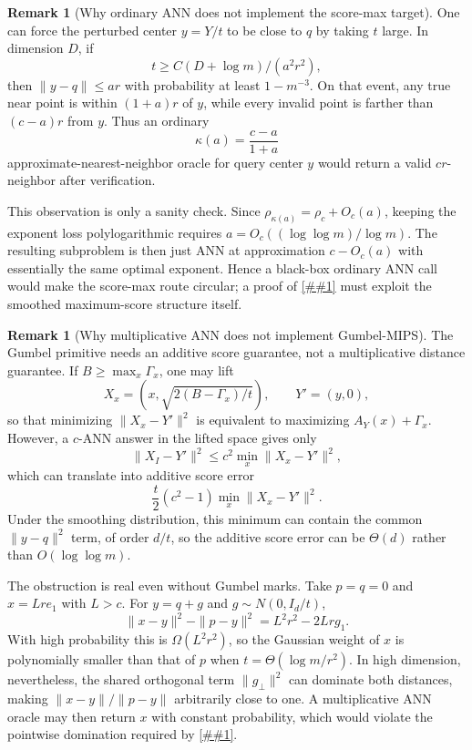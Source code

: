 \documentclass[10pt]{article}
\newcommand{\cref}[1]{\ref{##1}}
\theoremstyle{definition}
\newtheorem{remark}[theorem]{Remark}
\begin{document}
\begin{remark}[Why ordinary ANN does not implement the score-max target]\label{rem:score-max-ordinary-ann}
   One can force the perturbed center $y=Y/t$ to be close to $q$ by taking
   $t$ large. In dimension $D$, if
   \[
      t\ge C(D+\log m)/(a^2r^2),
   \]
   then $\|y-q\|\le ar$ with probability at least $1-m^{-3}$. On that event,
   any true near point is within $(1+a)r$ of $y$, while every invalid point is
   farther than $(c-a)r$ from $y$. Thus an ordinary
   \[
      \kappa(a)=\frac{c-a}{1+a}
   \]
   approximate-nearest-neighbor oracle for query center $y$ would return a
   valid $cr$-neighbor after verification.

   This observation is only a sanity check. Since
   $\rho_{\kappa(a)}=\rho_c+O_c(a)$, keeping the exponent loss polylogarithmic
   requires $a=O_c((\log\log m)/\log m)$. The resulting subproblem is then just
   ANN at approximation $c-O_c(a)$ with essentially the same optimal exponent.
   Hence a black-box ordinary ANN call would make the score-max route circular;
   a proof of \cref{asm:smoothed-score-max} must exploit the smoothed
   maximum-score structure itself.
\end{remark}

\begin{remark}[Why multiplicative ANN does not implement Gumbel-MIPS]\label{rem:gumbel-mips-not-ann}
   The Gumbel primitive needs an additive score guarantee, not a multiplicative
   distance guarantee. If $B\ge\max_x\Gamma_x$, one may lift
   \[
      X_x=\left(x,\sqrt{2(B-\Gamma_x)/t}\right),
      \qquad
      Y'=(y,0),
   \]
   so that minimizing $\|X_x-Y'\|^2$ is equivalent to maximizing
   $A_Y(x)+\Gamma_x$. However, a $c$-ANN answer in the lifted space gives only
   \[
      \|X_I-Y'\|^2
      \le
      c^2\min_x\|X_x-Y'\|^2,
   \]
   which can translate into additive score error
   \[
      \frac t2(c^2-1)\min_x\|X_x-Y'\|^2.
   \]
   Under the smoothing distribution, this minimum can contain the common
   $\|y-q\|^2$ term, of order $d/t$, so the additive score error can be
   $\Theta(d)$ rather than $O(\log\log m)$.

   The obstruction is real even without Gumbel marks. Take $p=q=0$ and
   $x=Lr e_1$ with $L>c$. For $y=q+g$ and $g\sim N(0,I_d/t)$,
   \[
      \|x-y\|^2-\|p-y\|^2=L^2r^2-2Lrg_1.
   \]
   With high probability this is $\Omega(L^2r^2)$, so the Gaussian weight of
   $x$ is polynomially smaller than that of $p$ when $t=\Theta(\log m/r^2)$.
   In high dimension, nevertheless, the shared orthogonal term
   $\|g_\perp\|^2$ can dominate both distances, making
   $\|x-y\|/\|p-y\|$ arbitrarily close to one. A multiplicative ANN oracle may
   then return $x$ with constant probability, which would violate the
   pointwise domination required by \cref{lem:gumbel-additive-domination}.
\end{remark}
\end{document}
